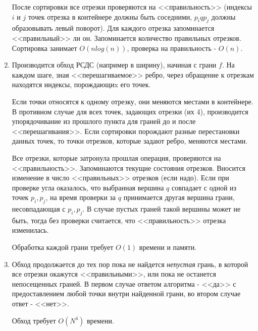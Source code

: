 \documentclass[letterpaper,12pt]{article}
\begin{document}
\begin{enumerate}
\begin{enumerate}
            \end{enumerate}
            \par
            После сортировки все отрезки проверяются на <<правильность>> 
            (индексы $i$ и $j$ точек отрезка в контейнере должны быть соседними,
            $p_i q p_j$ должны образовывать левый поворот). 
            Для каждого отрезка запоминается <<правильный>> ли он.
            Запоминается количество правильных отрезков. Сортировка занимает 
            $O(nlog(n))$, проверка на правильность - $O(n)$.
      \item Производится обход РСДС (например в ширину), начиная с грани $f$. 
            На каждом шаге, зная <<перешагиваемое>> ребро,
            через обращение к отрезкам находятся индексы, порождающиx его точек. 
            \par
            Если точки относятся к одному отрезку, они меняются местами в контейнере.
            В противном случае для всех точек, задающих отрезки (их 4), производится 
            упорядочивание из прошлого пункта для граней до и после <<перешагивания>>.
            Если сортировки порождают разные перестановки данных точек, то точки 
            отрезков, которые задают ребро, меняются местами.
            \par
            Все отрезки, которые затронула прошлая операция, проверяются на
            <<правильность>>. Запоминаются текущие состояния отрезков.
            Вносится изменение в число <<правильных>> отрезков (если надо). 
            Если при проверке угла оказалось, что выбранная вершина $q$
            совпадает с одной из точек $p_i, p_j$, на время проверки за $q$ принимается
            другая вершина грани, несовпадающая с $p_i, p_j$. В случае пустых граней
            такой вершины может не быть, тогда без проверки считается, что 
            <<правильность>> отрезка изменилась.
            \par
            Обработка каждой грани требует $O(1)$ времени и памяти. 
      \item Обход продолжается до тех пор пока не найдется \textsl{непустая}
            грань, в которой все отрезки окажутся <<правильными>>, или пока не
            останется непосещенных граней. В первом случае ответом алгоритма - <<да>>
            с предоставлением любой точки внутри найденной грани, во втором
            случае ответ - <<нет>>.
            \par
            Обход требует $O(N^4)$ времени.
\end{enumerate}
\end{document}
